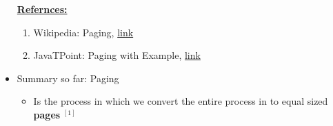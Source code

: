 \documentclass[12pt]{article}
\begin{document}
\begin{itemize}
    \bigskip

    \underline{\textbf{Refernces:}}

    \bigskip

    \begin{enumerate}[1)]
        \item Wikipedia: Paging, \href{https://en.wikipedia.org/wiki/Paging}{link}
        \item JavaTPoint: Paging with Example, \href{https://www.javatpoint.com/os-paging-with-example}{link}
    \end{enumerate}
    \item Summary so far: Paging
    \begin{itemize}
        \item Is the process in which we convert the entire process in to equal
        sized \textbf{pages} $^{[1]}$
    \end{itemize}

    \bigskip


\end{itemize}
\end{document}
